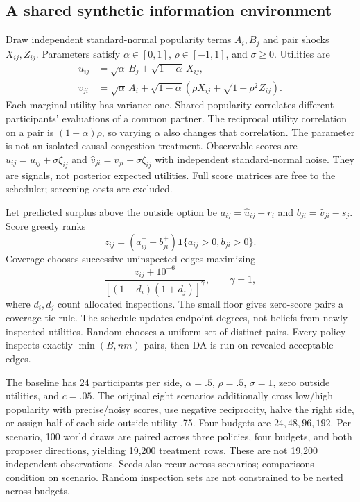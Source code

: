 \documentclass[11pt,a4paper]{article}
\newcommand{\ind}{\mathbf{1}}
\begin{document}
\subsection{A shared synthetic information environment}
Draw independent standard-normal popularity terms $A_i,B_j$ and pair shocks $X_{ij},Z_{ij}$. Parameters satisfy $\alpha\in[0,1]$, $\rho\in[-1,1]$, and $\sigma\ge0$. Utilities are
\begin{align}\label{eq:dgp}
u_{ij}&=\sqrt\alpha\, B_j+\sqrt{1-\alpha}\,X_{ij},\\
v_{ji}&=\sqrt\alpha\, A_i+\sqrt{1-\alpha}\left(\rho X_{ij}+\sqrt{1-\rho^2}Z_{ij}\right).
\end{align}
Each marginal utility has variance one. Shared popularity correlates different participants' evaluations of a common partner. The reciprocal utility correlation on a pair is $(1-\alpha)\rho$, so varying $\alpha$ also changes that correlation. The parameter is not an isolated causal congestion treatment. Observable scores are $\hat u_{ij}=u_{ij}+\sigma\xi_{ij}$ and $\hat v_{ji}=v_{ji}+\sigma\zeta_{ij}$ with independent standard-normal noise. They are signals, not posterior expected utilities. Full score matrices are free to the scheduler; screening costs are excluded.

Let predicted surplus above the outside option be $a_{ij}=\hat u_{ij}-r_i$ and $b_{ji}=\hat v_{ji}-s_j$. Score greedy ranks
\begin{equation}
z_{ij}=(a_{ij}^{+}+b_{ji}^{+})\ind\{a_{ij}>0,b_{ji}>0\}.
\end{equation}
Coverage chooses successive uninspected edges maximizing
\begin{equation}\label{eq:coverage}
\frac{z_{ij}+10^{-6}}{[(1+d_i)(1+d_j)]^\gamma},\qquad \gamma=1,
\end{equation}
where $d_i,d_j$ count allocated inspections. The small floor gives zero-score pairs a coverage tie rule. The schedule updates endpoint degrees, not beliefs from newly inspected utilities. Random chooses a uniform set of distinct pairs. Every policy inspects exactly $\min(B,nm)$ pairs, then DA is run on revealed acceptable edges.

The baseline has 24 participants per side, $\alpha=.5$, $\rho=.5$, $\sigma=1$, zero outside utilities, and $c=.05$. The original eight scenarios additionally cross low/high popularity with precise/noisy scores, use negative reciprocity, halve the right side, or assign half of each side outside utility .75. Four budgets are $24,48,96,192$. Per scenario, 100 world draws are paired across three policies, four budgets, and both proposer directions, yielding 19,200 treatment rows. These are not 19,200 independent observations. Seeds also recur across scenarios; comparisons condition on scenario. Random inspection sets are not constrained to be nested across budgets.
\end{document}
